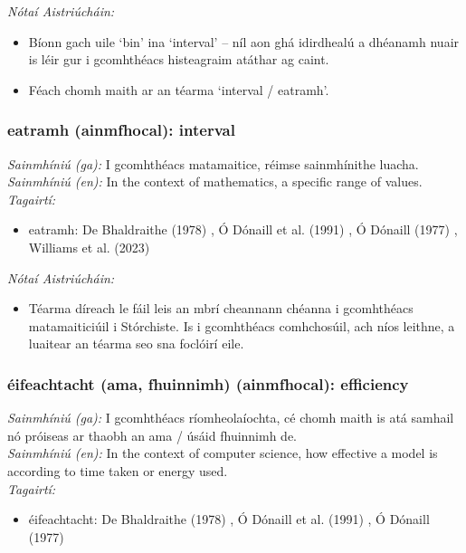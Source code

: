  \noindent \textit{Nótaí Aistriúcháin:}
\begin{itemize}
	\item Bíonn gach uile `bin' ina `interval' -- níl aon ghá idirdhealú a dhéanamh nuair is léir gur i gcomhthéacs histeagraim atáthar ag caint.
	\item Féach chomh maith ar an téarma `interval / eatramh'.
\end{itemize}


\subsubsection*{eatramh (ainmfhocal): interval}
 \noindent \textit{Sainmhíniú (ga):} I gcomhthéacs matamaitice, réimse sainmhínithe luacha.
\\
 \noindent \textit{Sainmhíniú (en):} In the context of mathematics, a specific range of values.
\\
 \noindent \textit{Tagairtí:}
\begin{itemize}
	\item eatramh: De Bhaldraithe (1978) \cite{de-bhaldraithe}, Ó Dónaill et al. (1991) \cite{focloir-beag}, Ó Dónaill (1977) \cite{odonaill}, Williams et al. (2023) \cite{storchiste}
\end{itemize}

 \noindent \textit{Nótaí Aistriúcháin:}
\begin{itemize}
	\item Téarma díreach le fáil leis an mbrí cheannann chéanna i gcomhthéacs matamaiticiúil i Stórchiste. Is i gcomhthéacs comhchosúil, ach níos leithne, a luaitear an téarma seo sna foclóirí eile.
\end{itemize}


\subsubsection*{éifeachtacht (ama, fhuinnimh) (ainmfhocal): efficiency}
 \noindent \textit{Sainmhíniú (ga):} I gcomhthéacs ríomheolaíochta, cé chomh maith is atá samhail nó próiseas ar thaobh an ama / úsáid fhuinnimh de.
\\
 \noindent \textit{Sainmhíniú (en):} In the context of computer science, how effective a model is according to time taken or energy used.
\\
 \noindent \textit{Tagairtí:}
\begin{itemize}
	\item éifeachtacht: De Bhaldraithe (1978) \cite{de-bhaldraithe}, Ó Dónaill et al. (1991) \cite{focloir-beag}, Ó Dónaill (1977) \cite{odonaill}
\end{itemize}

